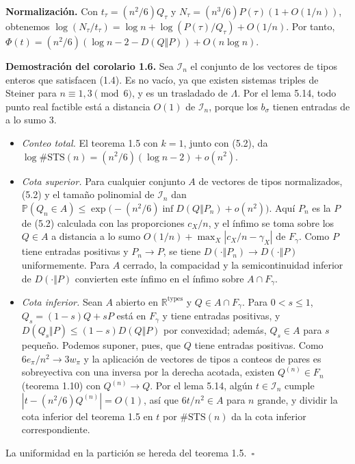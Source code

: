 \documentclass[spanish,11pt,a4paper]{article}
\providecommand{\tightlist}{\setlength{\itemsep}{0pt}\setlength{\parskip}{0pt}}
\begin{document}
\textbf{Normalización.} Con \(t_\tau=(n^2/6)Q_\tau\) y \(N_\tau=(n^3/6)P(\tau)(1+O(1/n))\), obtenemos \(\log(N_\tau/t_\tau)=\log n+\log(P(\tau)/Q_\tau)+O(1/n)\). Por tanto, \(\Phi(t)=(n^2/6)(\log n-2-D(Q\Vert P))+O(n\log n)\).

\textbf{Demostración del corolario 1.6.} Sea \(\mathcal I_n\) el conjunto de los vectores de tipos enteros que satisfacen (1.4). Es no vacío, ya que existen sistemas triples de Steiner para \(n\equiv1,3\pmod 6\), y es un trasladado de \(\Lambda\). Por el lema 5.14, todo punto real factible está a distancia \(O(1)\) de \(\mathcal I_n\), porque los \(b_\sigma\) tienen entradas de a lo sumo 3.

\begin{itemize}
\tightlist
\item
  \emph{Conteo total.} El teorema 1.5 con \(k=1\), junto con (5.2), da \(\log\#\mathrm{STS}(n)=(n^2/6)(\log n-2)+o(n^2)\).
\item
  \emph{Cota superior.} Para cualquier conjunto \(A\) de vectores de tipos normalizados, (5.2) y el tamaño polinomial de \(\mathcal I_n\) dan \(\mathbb P(Q_n\in A)\le\exp\bigl(-(n^2/6)\inf D(Q\Vert P_n)+o(n^2)\bigr)\). Aquí \(P_n\) es la \(P\) de (5.2) calculada con las proporciones \(c_X/n\), y el ínfimo se toma sobre los \(Q\in A\) a distancia a lo sumo \(O(1/n)+\max_X|c_X/n-\gamma_X|\) de \(F_\gamma\). Como \(P\) tiene entradas positivas y \(P_n\to P\), se tiene \(D(\cdot\Vert P_n)\to D(\cdot\Vert P)\) uniformemente. Para \(A\) cerrado, la compacidad y la semicontinuidad inferior de \(D(\cdot\Vert P)\) convierten este ínfimo en el ínfimo sobre \(A\cap F_\gamma\).
\item
  \emph{Cota inferior.} Sean \(A\) abierto en \(\mathbb R^{\mathrm{types}}\) y \(Q\in A\cap F_\gamma\). Para \(0<s\le1\), \(Q_s=(1-s)Q+sP\) está en \(F_\gamma\) y tiene entradas positivas, y \(D(Q_s\Vert P)\le(1-s)D(Q\Vert P)\) por convexidad; además, \(Q_s\in A\) para \(s\) pequeño. Podemos suponer, pues, que \(Q\) tiene entradas positivas. Como \(6e_\pi/n^2\to3w_\pi\) y la aplicación de vectores de tipos a conteos de pares es sobreyectiva con una inversa por la derecha acotada, existen \(Q^{(n)}\in F_n\) (teorema 1.10) con \(Q^{(n)}\to Q\). Por el lema 5.14, algún \(t\in\mathcal I_n\) cumple \(|t-(n^2/6)Q^{(n)}|=O(1)\), así que \(6t/n^2\in A\) para \(n\) grande, y dividir la cota inferior del teorema 1.5 en \(t\) por \(\#\mathrm{STS}(n)\) da la cota inferior correspondiente.
\end{itemize}

La uniformidad en la partición se hereda del teorema 1.5.~\(\square\)
\end{document}

